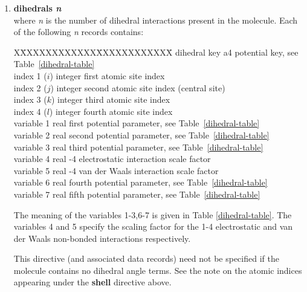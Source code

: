 \begin{enumerate}
\item{\bf dihedrals {\em n}} \\
where {\em n} is the number of dihedral interactions present in
the molecule.  Each of the following {\em n} records contains:
\begin{tabbing}
X\=XXXXXXXXXXXX\=XXXXXXXXXXXX\=\kill
\> dihedral key  \> a4      \> potential key, see Table~\ref{dihedral-table} \\
\> index 1 ($i$) \> integer \> first atomic site index \\
\> index 2 ($j$) \> integer \> second atomic site index (central site) \\
\> index 3 ($k$) \> integer \> third atomic site index \\
\> index 4 ($l$) \> integer \> fourth atomic site index \\
\> variable 1    \> real    \> first potential parameter, see Table~\ref{dihedral-table} \\
\> variable 2    \> real    \> second potential parameter, see Table~\ref{dihedral-table} \\
\> variable 3    \> real    \> third potential parameter, see Table~\ref{dihedral-table} \\
\> variable 4    \> real    -4 electrostatic interaction scale factor \\
\> variable 5    \> real    -4 van der Waals interaction scale factor \\
\> variable 6    \> real    \> fourth potential parameter, see Table~\ref{dihedral-table} \\
\> variable 7    \> real    \> fifth potential parameter, see Table~\ref{dihedral-table}
\end{tabbing}
The meaning of the variables 1-3,6-7 is given in Table
\ref{dihedral-table}.  The variables 4 and 5 specify the scaling
factor for the 1-4 electrostatic and van der Waals non-bonded
interactions respectively.

This directive (and associated data records) need not be specified
if the molecule contains no dihedral
angle terms.  See the note on the atomic indices appearing under
the {\bf shell} directive above.


\end{enumerate}
